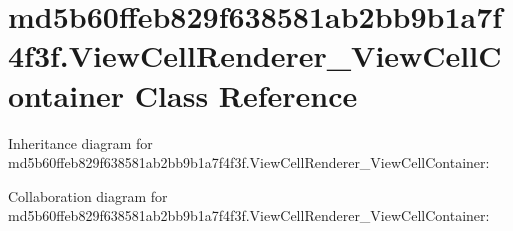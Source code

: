 \hypertarget{classmd5b60ffeb829f638581ab2bb9b1a7f4f3f_1_1_view_cell_renderer___view_cell_container}{}\section{md5b60ffeb829f638581ab2bb9b1a7f4f3f.\+View\+Cell\+Renderer\+\_\+\+View\+Cell\+Container Class Reference}
\label{classmd5b60ffeb829f638581ab2bb9b1a7f4f3f_1_1_view_cell_renderer___view_cell_container}


Inheritance diagram for md5b60ffeb829f638581ab2bb9b1a7f4f3f.\+View\+Cell\+Renderer\+\_\+\+View\+Cell\+Container\+:


Collaboration diagram for md5b60ffeb829f638581ab2bb9b1a7f4f3f.\+View\+Cell\+Renderer\+\_\+\+View\+Cell\+Container\+:
